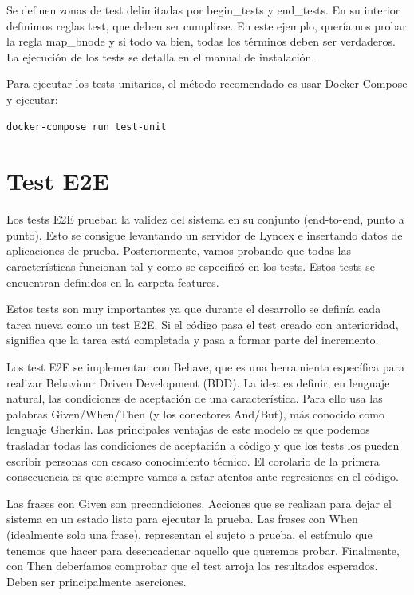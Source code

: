 \documentclass[12pt]{report} %
\begin{document}
Se definen zonas de test delimitadas por begin\_tests y end\_tests. En su interior definimos reglas test, que deben ser cumplirse. En este ejemplo, queríamos probar la regla map\_bnode y si todo va bien, todas los términos deben ser verdaderos. La ejecución de los tests se detalla en el manual de instalación.

Para ejecutar los tests unitarios, el método recomendado es usar Docker Compose y ejecutar:

\begin{verbatim}
docker-compose run test-unit
\end{verbatim}

\section{Test E2E}

Los tests E2E prueban la validez del sistema en su conjunto (end-to-end, punto a punto). Esto se consigue levantando un servidor de Lyncex e insertando datos de aplicaciones de prueba. Posteriormente, vamos probando que todas las características funcionan tal y como se especificó en los tests. Estos tests se encuentran definidos en la carpeta features.

Estos tests son muy importantes ya que durante el desarrollo se definía cada tarea nueva como un test E2E. Si el código pasa el test creado con anterioridad, significa que la tarea está completada y pasa a formar parte del incremento.

Los test E2E se implementan con Behave, que es una herramienta específica para realizar Behaviour Driven Development (BDD). La idea es definir, en lenguaje natural, las condiciones de aceptación de una característica. Para ello usa las palabras Given/When/Then (y los conectores And/But), más conocido como lenguaje Gherkin. Las principales ventajas de este modelo es que podemos trasladar todas las condiciones de aceptación a código y que los tests los pueden escribir personas con escaso conocimiento técnico. El corolario de la primera consecuencia es que siempre vamos a estar atentos ante regresiones en el código.

Las frases con Given son precondiciones. Acciones que se realizan para dejar el sistema en un estado listo para ejecutar la prueba. Las frases con When (idealmente solo una frase), representan el sujeto a prueba, el estímulo que tenemos que hacer para desencadenar aquello que queremos probar. Finalmente, con Then deberíamos comprobar que el test arroja los resultados esperados. Deben ser principalmente aserciones.
\end{document}
